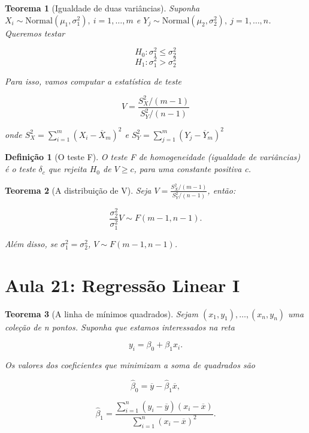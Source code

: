\documentclass{article}
\newtheorem{theorem}{Teorema}
\newtheorem{definition}{Definição}
\begin{document}
	\begin{theorem}[Igualdade de duas variâncias]
		Suponha $X_i \sim \mathrm{Normal}(\mu_1, \sigma_1^2), \ i = 1, \ldots, m$ e $Y_j \sim \mathrm{Normal}(\mu_2, \sigma_2^2), \ j = 1, \ldots, n$. Queremos testar
		
		$$H_0 : \sigma_1^2 \leq \sigma_2^2$$
		$$H_1 : \sigma_1^2 > \sigma_2^2$$
		
		Para isso, vamos computar a estatística de teste
		
		$$V = \frac{S_X^2 / (m - 1)}{S_Y^2 / (n - 1)}$$
		
		onde $S_X^2 = \sum_{i = 1}^m (X_i - \overline{X}_m)^2$ e $S_Y^2 = \sum_{j = 1}^m (Y_j - \overline{Y}_m)^2$
	\end{theorem}
	
	\begin{definition}[O teste F]
		O teste F de homogeneidade (igualdade de variâncias) é o teste $\delta_c$ que rejeita $H_0$ de $V \geq c$, para uma constante positiva c.
	\end{definition}
	
	\begin{theorem}[A distribuição de V]
		Seja $V = \frac{S_X^2 / (m - 1)}{S_Y^2 / (n - 1)}$, então:
		
		$$\frac{\sigma_2^2}{\sigma_1^2} V \sim F(m - 1, n - 1).$$
		
		Além disso, se $\sigma_1^2 = \sigma_2^2$, $V \sim F(m - 1, n - 1)$.
	\end{theorem}
	
	\section*{Aula 21: Regressão Linear I}\label{s21}
	\begin{theorem}[A linha de mínimos quadrados]
		Sejam $(x_1, y_1), \ldots, (x_n, y_n)$ uma coleção de n pontos. Suponha que estamos interessados na reta
		
		\begin{equation}
			y_i = \beta_0 + \beta_1 x_i.
		\end{equation}
		
		Os valores dos coeficientes que minimizam a  soma de quadrados são
		
		$$\hat{\beta}_0 = \overline{y} - \hat{\beta}_1 \overline{x},$$
		
		$$\hat{\beta}_1 = \frac{\sum_{i = 1}^n (y_i - \overline{y}) (x_i - \overline{x})}{\sum_{i = 1}^n (x_i - \overline{x})^2}.$$
	\end{theorem}
	
\end{document}
